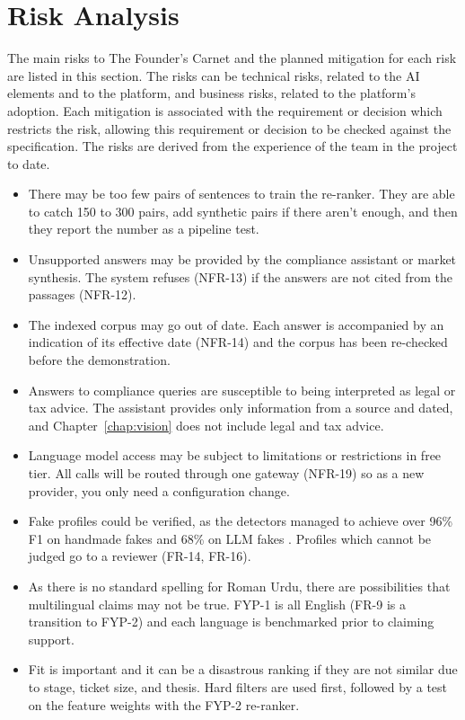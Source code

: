 \documentclass{FastFyp}
\begin{document}
\section{Risk Analysis}
The main risks to The Founder's Carnet and the planned mitigation for each risk are listed in this section. The risks can be technical risks, related to the AI elements and to the platform, and business risks, related to the platform's adoption. Each mitigation is associated with the requirement or decision which restricts the risk, allowing this requirement or decision to be checked against the specification. The risks are derived from the experience of the team in the project to date.
\begin{itemize}
 \item There may be too few pairs of sentences to train the re-ranker. They are able to catch 150 to 300 pairs, add synthetic pairs if there aren't enough, and then they report the number as a pipeline test.
 \item Unsupported answers may be provided by the compliance assistant or market synthesis. The system refuses (NFR-13) if the answers are not cited from the passages (NFR-12).
 \item The indexed corpus may go out of date. Each answer is accompanied by an indication of its effective date (NFR-14) and the corpus has been re-checked before the demonstration.
 \item Answers to compliance queries are susceptible to being interpreted as legal or tax advice. The assistant provides only information from a source and dated, and Chapter~\ref{chap:vision} does not include legal and tax advice.
 \item Language model access may be subject to limitations or restrictions in free tier. All calls will be routed through one gateway (NFR-19) so as a new provider, you only need a configuration change.
 \item Fake profiles could be verified, as the detectors managed to achieve over 96\% F1 on handmade fakes and 68\% on LLM fakes \cite{ref:gulati2025}. Profiles which cannot be judged go to a reviewer (FR-14, FR-16).
 \item As there is no standard spelling for Roman Urdu, there are possibilities that multilingual claims may not be true. FYP-1 is all English (FR-9 is a transition to FYP-2) and each language is benchmarked prior to claiming support.
\item Fit is important and it can be a disastrous ranking if they are not similar due to stage, ticket size, and thesis. Hard filters are used first, followed by a test on the feature weights with the FYP-2 re-ranker.

\end{itemize}
\end{document}
